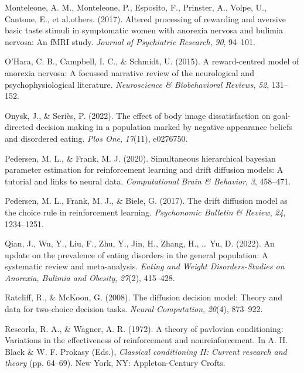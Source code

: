 \documentclass[
  man,floatsintext]{apa6}
\newlength{\cslhangindent}
\newlength{\cslentryspacingunit} %
\newenvironment{CSLReferences}[2] %
 {%
  \setlength{\parindent}{0pt}
  \ifodd #1
  \let\oldpar\par
  \def\par{\hangindent=\cslhangindent\oldpar}
  \fi
  \setlength{\parskip}{#2\cslentryspacingunit}
 }%
 {}
\begin{document}
\begin{CSLReferences}{1}{0}
\leavevmode{}%
Monteleone, A. M., Monteleone, P., Esposito, F., Prinster, A., Volpe, U., Cantone, E., et al.others. (2017). Altered processing of rewarding and aversive basic taste stimuli in symptomatic women with anorexia nervosa and bulimia nervosa: An fMRI study. \emph{Journal of Psychiatric Research}, \emph{90}, 94--101.

\leavevmode{}%
O'Hara, C. B., Campbell, I. C., \& Schmidt, U. (2015). A reward-centred model of anorexia nervosa: A focussed narrative review of the neurological and psychophysiological literature. \emph{Neuroscience \& Biobehavioral Reviews}, \emph{52}, 131--152.

\leavevmode{}%
Onysk, J., \& Seriès, P. (2022). The effect of body image dissatisfaction on goal-directed decision making in a population marked by negative appearance beliefs and disordered eating. \emph{Plos One}, \emph{17}(11), e0276750.

\leavevmode{}%
Pedersen, M. L., \& Frank, M. J. (2020). Simultaneous hierarchical bayesian parameter estimation for reinforcement learning and drift diffusion models: A tutorial and links to neural data. \emph{Computational Brain \& Behavior}, \emph{3}, 458--471.

\leavevmode{}%
Pedersen, M. L., Frank, M. J., \& Biele, G. (2017). The drift diffusion model as the choice rule in reinforcement learning. \emph{Psychonomic Bulletin \& Review}, \emph{24}, 1234--1251.

\leavevmode{}%
Qian, J., Wu, Y., Liu, F., Zhu, Y., Jin, H., Zhang, H., \ldots{} Yu, D. (2022). An update on the prevalence of eating disorders in the general population: A systematic review and meta-analysis. \emph{Eating and Weight Disorders-Studies on Anorexia, Bulimia and Obesity}, \emph{27}(2), 415--428.

\leavevmode{}%
Ratcliff, R., \& McKoon, G. (2008). The diffusion decision model: Theory and data for two-choice decision tasks. \emph{Neural Computation}, \emph{20}(4), 873--922.

\leavevmode{}%
Rescorla, R. A., \& Wagner, A. R. (1972). A theory of pavlovian conditioning: Variations in the effectiveness of reinforcement and nonreinforcement. In A. H. Black \& W. F. Prokasy (Eds.), \emph{Classical conditioning II: Current research and theory} (pp. 64--69). New York, NY: Appleton-Century Crofts.


\end{CSLReferences}
\end{document}
